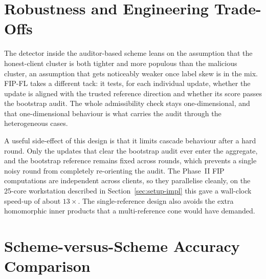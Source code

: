 \section{Robustness and Engineering Trade-Offs}
\label{sec:comp-robust-engineering}

The detector inside the auditor-based scheme leans on the assumption that the honest-client cluster is both tighter and more populous than the malicious cluster, an assumption that gets noticeably weaker once label skew is in the mix. FIP-FL takes a different tack: it tests, for each individual update, whether the update is aligned with the trusted reference direction and whether its score passes the bootstrap audit. The whole admissibility check stays one-dimensional, and that one-dimensional behaviour is what carries the audit through the heterogeneous cases.

A useful side-effect of this design is that it limits cascade behaviour after a hard round. Only the updates that clear the bootstrap audit ever enter the aggregate, and the bootstrap reference remains fixed across rounds, which prevents a single noisy round from completely re-orienting the audit. The Phase~II FIP computations are independent across clients, so they parallelise cleanly, on the 25-core workstation described in Section~\ref{sec:setup-impl} this gave a wall-clock speed-up of about $13\times$. The single-reference design also avoids the extra homomorphic inner products that a multi-reference cone would have demanded.

\section{Scheme-versus-Scheme Accuracy Comparison}
\label{sec:comp-accuracy}

